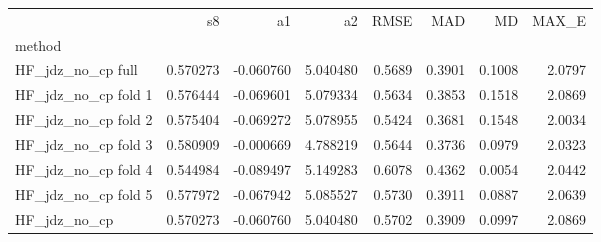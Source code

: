 \begin{tabular}{lrrrrrrr}
 & s8 & a1 & a2 & RMSE & MAD & MD & MAX_E \\
method &  &  &  &  &  &  &  \\
HF_jdz_no_cp full & 0.570273 & -0.060760 & 5.040480 & 0.5689 & 0.3901 & 0.1008 & 2.0797 \\
HF_jdz_no_cp fold 1 & 0.576444 & -0.069601 & 5.079334 & 0.5634 & 0.3853 & 0.1518 & 2.0869 \\
HF_jdz_no_cp fold 2 & 0.575404 & -0.069272 & 5.078955 & 0.5424 & 0.3681 & 0.1548 & 2.0034 \\
HF_jdz_no_cp fold 3 & 0.580909 & -0.000669 & 4.788219 & 0.5644 & 0.3736 & 0.0979 & 2.0323 \\
HF_jdz_no_cp fold 4 & 0.544984 & -0.089497 & 5.149283 & 0.6078 & 0.4362 & 0.0054 & 2.0442 \\
HF_jdz_no_cp fold 5 & 0.577972 & -0.067942 & 5.085527 & 0.5730 & 0.3911 & 0.0887 & 2.0639 \\
HF_jdz_no_cp & 0.570273 & -0.060760 & 5.040480 & 0.5702 & 0.3909 & 0.0997 & 2.0869 \\
\end{tabular}
